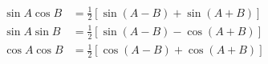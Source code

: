 \message{ !name(mathematics.tex)}\documentclass[12pt]{article}
\begin{document}

\begin{align*}
  \sin A \cos B &= \frac{1}{2}\left[ \sin(A-B)+\sin(A+B) \right] \\
  \sin A \sin B &= \frac{1}{2}\left[ \sin(A-B)-\cos(A+B) \right] \\
  \cos A \cos B &= \frac{1}{2}\left[ \cos(A-B)+\cos(A+B) \right] \\
\end{align*}
\end{document}
